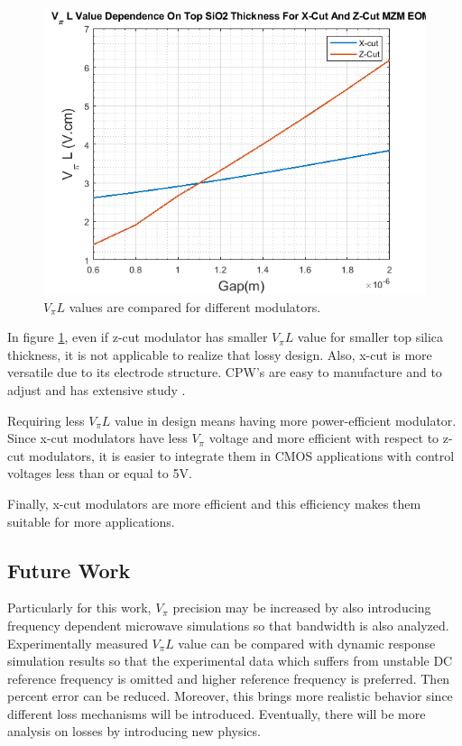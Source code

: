 \documentclass[thesis]{deutez}
\begin{document}
    \begin{figure}[h]
        \centering
        \includegraphics[width=0.75\linewidth]{comp_simulations.png}
        \caption{$V_\pi L$  values are compared for different modulators.}
        \label{fig:voltage-comparision}
    \end{figure}

    In figure \ref{fig:voltage-comparision}, even if z-cut modulator has smaller $V_\pi L$ value for smaller top silica thickness, it is not applicable to realize that lossy design. Also, x-cut is more versatile due to its electrode structure. CPW's are easy to manufacture and to adjust and has extensive study \cite{12}. 

    Requiring less $V_\pi L$ value in design means having more power-efficient modulator. Since x-cut modulators have less $V_\pi$ voltage and more efficient with respect to z-cut modulators, it is easier to integrate them in CMOS applications with control voltages less than or equal to 5V. 
    
    Finally, x-cut modulators are more efficient and this efficiency makes them suitable for more applications. 

    \subsection{Future Work}
        Particularly for this work, $V_\pi$ precision may be increased by also introducing frequency dependent microwave simulations so that bandwidth is also analyzed. Experimentally measured $V_\pi L$ value can be compared with dynamic response simulation results so that the experimental data which suffers from unstable DC reference frequency is omitted and higher reference frequency is preferred. Then percent error can be reduced.  Moreover, this brings more realistic behavior since different loss mechanisms will be introduced.  Eventually, there will be more analysis on losses by introducing new physics.
\end{document}
